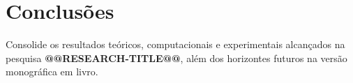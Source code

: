 \section{Conclusões}\label{sec:conclusoes}

Consolide os resultados teóricos, computacionais e experimentais alcançados na pesquisa \textbf{@@RESEARCH-TITLE@@}, além dos horizontes futuros na versão monográfica em livro.
